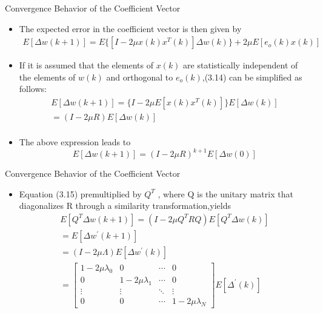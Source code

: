 \documentclass{beamer}
\begin{document}
\begin{frame}{Convergence Behavior of the Coefficient Vector}
    \begin{itemize}
       \item The expected error in the coefficient vector is then given by 
        \begin{multline}
            E[\Delta w(k+1)] = E\{[I - 2\mu x(k)x^T(k)]\Delta w(k)\} + 2\mu E[e_o(k)x(k)]
        \end{multline}
        \item If it is assumed that the elements of $x(k)$ are statistically independent of the elements of $w(k)$ and orthogonal to $e_o(k)$,(3.14) can be simplified as follows: 
        \begin{multline}
            E[\Delta w(k+1)] = \{I - 2\mu E[x(k)x^T(k)]\}E[\Delta w(k)]\\
                            = (I - 2\mu R)E[\Delta w(k)]\\
        \end{multline}
        \item The above expression leads to
        \begin{equation}
            E[\Delta w(k+1)] = (I - 2\mu R)^{k+1}E[\Delta w(0)]
        \end{equation}
    \end{itemize}
\end{frame}

\begin{frame}{Convergence Behavior of the Coefficient Vector}
    \begin{itemize}
       \item Equation (3.15) premultiplied by $Q^T$ , where Q is the unitary matrix that diagonalizes R through a similarity transformation,yields 
       \begin{multline}
        E[Q^T\Delta w(k+1)] = (I - 2\mu Q^TRQ)E[Q^T\Delta w(k)]\\
                           = E[\Delta w^{'}(k+1)]\\
                           = (I - 2\mu \Lambda)E[\Delta w^{'}(k)]\\
                           =\begin{bmatrix}
                            1-2\mu \lambda_0 & 0 & \cdots & 0 \\
                            0 & 1-2\mu \lambda_1 & \cdots & 0 \\
                            \vdots & \vdots & \ddots & \vdots \\
                            0 & 0 & \cdots &1-2\mu \lambda_N
                           \end{bmatrix}E[\Delta^{'}(k)]                  
        \end{multline}
         
        
    \end{itemize}
\end{frame}
\end{document}
